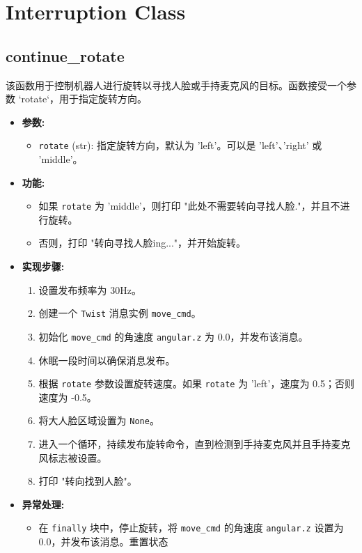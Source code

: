 \documentclass[]{article}
\begin{document}
\section{Interruption Class}
\subsection{continue\_rotate}
该函数用于控制机器人进行旋转以寻找人脸或手持麦克风的目标。函数接受一个参数 `rotate`，用于指定旋转方向。

\begin{itemize}
	\item \textbf{参数:}
	\begin{itemize}
		\item \texttt{rotate} (str): 指定旋转方向，默认为 'left'。可以是 'left'、'right' 或 'middle'。
	\end{itemize}
	\item \textbf{功能:}
	\begin{itemize}
		\item 如果 \texttt{rotate} 为 'middle'，则打印 "此处不需要转向寻找人脸."，并且不进行旋转。
		\item 否则，打印 "转向寻找人脸ing..."，并开始旋转。
	\end{itemize}
	\item \textbf{实现步骤:}
	\begin{enumerate}
		\item 设置发布频率为 30Hz。
		\item 创建一个 \texttt{Twist} 消息实例 \texttt{move\_cmd}。
		\item 初始化 \texttt{move\_cmd} 的角速度 \texttt{angular.z} 为 0.0，并发布该消息。
		\item 休眠一段时间以确保消息发布。
		\item 根据 \texttt{rotate} 参数设置旋转速度。如果 \texttt{rotate} 为 'left'，速度为 0.5；否则速度为 -0.5。
		\item 将大人脸区域设置为 \texttt{None}。
		\item 进入一个循环，持续发布旋转命令，直到检测到手持麦克风并且手持麦克风标志被设置。
		\item 打印 "转向找到人脸"。
	\end{enumerate}
	\item \textbf{异常处理:}
	\begin{itemize}
		\item 在 \texttt{finally} 块中，停止旋转，将 \texttt{move\_cmd} 的角速度 \texttt{angular.z} 设置为 0.0，并发布该消息。重置状态
	\end{itemize}

\end{itemize}
\end{document}
